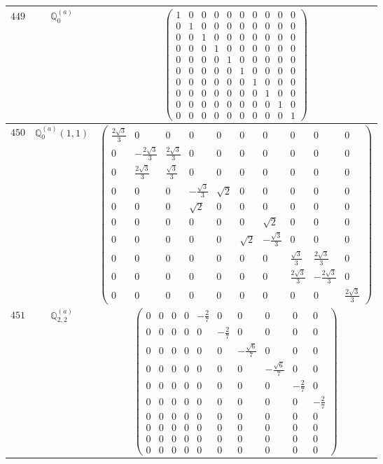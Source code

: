 \documentclass[fleqn,8pt,landscape]{jsarticle}
\begin{document}
\begin{center}
\begin{longtable}{ccc}
$ 449 $ & $ \mathbb{Q}_{0}^{(a)} $ & $ \begin{pmatrix} 1 & 0 & 0 & 0 & 0 & 0 & 0 & 0 & 0 & 0 \\ 0 & 1 & 0 & 0 & 0 & 0 & 0 & 0 & 0 & 0 \\ 0 & 0 & 1 & 0 & 0 & 0 & 0 & 0 & 0 & 0 \\ 0 & 0 & 0 & 1 & 0 & 0 & 0 & 0 & 0 & 0 \\ 0 & 0 & 0 & 0 & 1 & 0 & 0 & 0 & 0 & 0 \\ 0 & 0 & 0 & 0 & 0 & 1 & 0 & 0 & 0 & 0 \\ 0 & 0 & 0 & 0 & 0 & 0 & 1 & 0 & 0 & 0 \\ 0 & 0 & 0 & 0 & 0 & 0 & 0 & 1 & 0 & 0 \\ 0 & 0 & 0 & 0 & 0 & 0 & 0 & 0 & 1 & 0 \\ 0 & 0 & 0 & 0 & 0 & 0 & 0 & 0 & 0 & 1 \end{pmatrix} $ \\ \hline
$ 450 $ & $ \mathbb{Q}_{0}^{(a)}(1,1) $ & $ \begin{pmatrix} \frac{2 \sqrt{3}}{3} & 0 & 0 & 0 & 0 & 0 & 0 & 0 & 0 & 0 \\ 0 & - \frac{2 \sqrt{3}}{3} & \frac{2 \sqrt{3}}{3} & 0 & 0 & 0 & 0 & 0 & 0 & 0 \\ 0 & \frac{2 \sqrt{3}}{3} & \frac{\sqrt{3}}{3} & 0 & 0 & 0 & 0 & 0 & 0 & 0 \\ 0 & 0 & 0 & - \frac{\sqrt{3}}{3} & \sqrt{2} & 0 & 0 & 0 & 0 & 0 \\ 0 & 0 & 0 & \sqrt{2} & 0 & 0 & 0 & 0 & 0 & 0 \\ 0 & 0 & 0 & 0 & 0 & 0 & \sqrt{2} & 0 & 0 & 0 \\ 0 & 0 & 0 & 0 & 0 & \sqrt{2} & - \frac{\sqrt{3}}{3} & 0 & 0 & 0 \\ 0 & 0 & 0 & 0 & 0 & 0 & 0 & \frac{\sqrt{3}}{3} & \frac{2 \sqrt{3}}{3} & 0 \\ 0 & 0 & 0 & 0 & 0 & 0 & 0 & \frac{2 \sqrt{3}}{3} & - \frac{2 \sqrt{3}}{3} & 0 \\ 0 & 0 & 0 & 0 & 0 & 0 & 0 & 0 & 0 & \frac{2 \sqrt{3}}{3} \end{pmatrix} $ \\ \hline
$ 451 $ & $ \mathbb{Q}_{2,2}^{(a)} $ & $ \begin{pmatrix} 0 & 0 & 0 & 0 & - \frac{2}{7} & 0 & 0 & 0 & 0 & 0 \\ 0 & 0 & 0 & 0 & 0 & - \frac{2}{7} & 0 & 0 & 0 & 0 \\ 0 & 0 & 0 & 0 & 0 & 0 & - \frac{\sqrt{6}}{7} & 0 & 0 & 0 \\ 0 & 0 & 0 & 0 & 0 & 0 & 0 & - \frac{\sqrt{6}}{7} & 0 & 0 \\ 0 & 0 & 0 & 0 & 0 & 0 & 0 & 0 & - \frac{2}{7} & 0 \\ 0 & 0 & 0 & 0 & 0 & 0 & 0 & 0 & 0 & - \frac{2}{7} \\ 0 & 0 & 0 & 0 & 0 & 0 & 0 & 0 & 0 & 0 \\ 0 & 0 & 0 & 0 & 0 & 0 & 0 & 0 & 0 & 0 \\ 0 & 0 & 0 & 0 & 0 & 0 & 0 & 0 & 0 & 0 \\ 0 & 0 & 0 & 0 & 0 & 0 & 0 & 0 & 0 & 0 \end{pmatrix} $ \\ \hline

\end{longtable}
\end{center}
\end{document}
